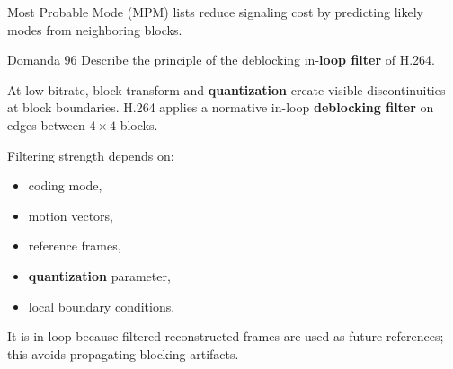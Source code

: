 Most Probable Mode (MPM) lists reduce signaling cost by predicting likely modes from neighboring blocks.



\begin{questionbox}{Domanda 96}
Describe the principle of the deblocking in-\textbf{loop filter} of H.264.
\end{questionbox}


At low bitrate, block transform and \textbf{quantization} create visible discontinuities at block boundaries. H.264 applies a normative in-loop \textbf{deblocking filter} on edges between $4\times4$ blocks.

Filtering strength depends on:

\begin{itemize}
  \item coding mode,
  \item motion vectors,
  \item reference frames,
  \item \textbf{quantization} parameter,
  \item local boundary conditions.
\end{itemize}

It is in-loop because filtered reconstructed frames are used as future references; this avoids propagating blocking artifacts.


